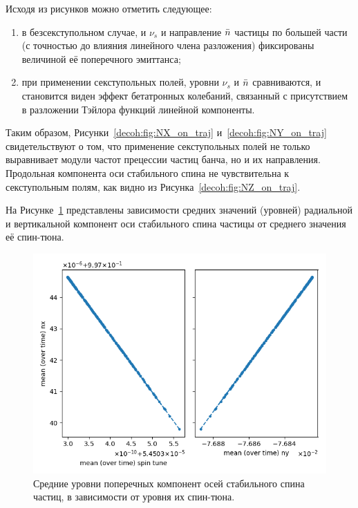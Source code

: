 Исходя из рисунков можно отметить следующее:
\begin{enumerate}
	\item в безсекступольном случае, и $\nu_s$ и направление $\bar n$ частицы по большей части (с точностью до влияния линейного члена разложения) фиксированы величиной её поперечного эмиттанса;
	\item при применении секступольных полей, уровни $\nu_s$ и $\bar n$ сравниваются, и становится виден эффект бетатронных колебаний, связанный с присутствием в разложении Тэйлора функций линейной компоненты.
\end{enumerate}
Таким образом, Рисунки~\ref{decoh:fig:NX_on_traj} и~\ref{decoh:fig:NY_on_traj} свидетельствуют о том, что применение секступольных полей не только выравнивает модули частот прецессии частиц банча, но и их направления. Продольная компонента оси стабильного спина не чувствительна к секступольным полям, как видно из Рисунка~\ref{decoh:fig:NZ_on_traj}.


На Рисунке~\ref{decoh:fig:nbar_vs_ST} представлены зависимости средних значений (уровней) радиальной и вертикальной компонент оси стабильного спина частицы от среднего значения её спин-тюна. 
\begin{figure}[!h]
	\centering
	\includegraphics[height=.35\paperheight]{images/decoh_sim/mean_n_bar_vs_spin_tune}
	\caption{Средние уровни поперечных компонент осей стабильного спина частиц, в зависимости от уровня их спин-тюна.\label{decoh:fig:nbar_vs_ST}}
\end{figure}

